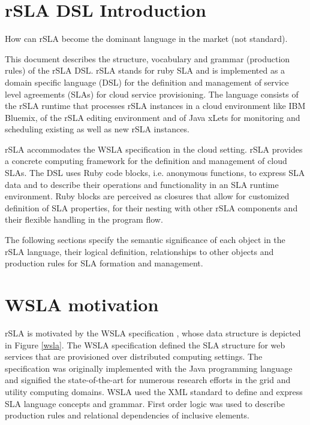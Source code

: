 \documentclass{llncs}
\begin{document}
\lstset{numbers=left, basicstyle=\small, numbersep=5pt, numberstyle=\tiny}

\tableofcontents

\section{rSLA DSL Introduction}
How can rSLA become the dominant language in the market (not standard). 

This document describes the structure, vocabulary and grammar (production rules) of the rSLA DSL. rSLA stands for ruby SLA and is implemented as a domain specific language (DSL) for the definition and management of service level agreements (SLAs) for cloud service provisioning. The language consists of the rSLA runtime that processes rSLA instances in a cloud environment like IBM Bluemix, of the rSLA editing environment and of Java xLets for monitoring and scheduling existing as well as new rSLA instances. 

rSLA accommodates the WSLA specification \cite{wsla} in the cloud setting. rSLA provides a concrete computing framework for the definition and management of cloud SLAs. The DSL uses Ruby code blocks, i.e. anonymous functions, to express SLA data and to describe their operations and functionality in an SLA runtime environment. Ruby blocks are perceived as closures that allow for customized definition of SLA properties, for their nesting with other rSLA components and their flexible handling in the program flow. 

The following sections specify the semantic significance of each object in the rSLA language, their logical definition, relationships to other objects and production rules for SLA formation and management.

\section{WSLA motivation}
rSLA is motivated by the WSLA specification \cite{wsla}, whose data structure is depicted in Figure \ref{wsla}. The WSLA specification defined the SLA structure for web services that are provisioned over distributed computing settings. The specification was originally implemented with the Java programming language and signified the state-of-the-art for numerous research efforts in the grid and utility computing domains. WSLA used the XML standard \cite{xml} to define and express SLA language concepts and grammar. First order logic was used to describe production rules and relational dependencies of inclusive elements.
\end{document}
